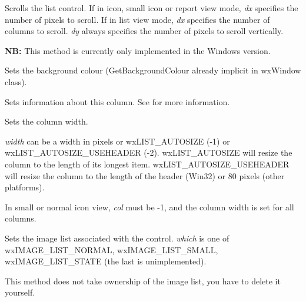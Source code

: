 \label{wxlistctrlscrolllist}


Scrolls the list control. If in icon, small icon or report view mode,
{\it dx} specifies the number of pixels to scroll. If in list view mode,
{\it dx} specifies the number of columns to scroll. {\it dy} always specifies
the number of pixels to scroll vertically.

{\bf NB:} This method is currently only implemented in the Windows version.


\label{wxlistctrlsetbackgroundcolour}


Sets the background colour (GetBackgroundColour already implicit in
wxWindow class).


\label{wxlistctrlsetcolumn}


Sets information about this column. See  for more
information.


\label{wxlistctrlsetcolumnwidth}


Sets the column width.

{\it width} can be a width in pixels or wxLIST\_AUTOSIZE (-1) or wxLIST\_AUTOSIZE\_USEHEADER (-2).
wxLIST\_AUTOSIZE will resize the column to the length of its longest item. wxLIST\_AUTOSIZE\_USEHEADER
will resize the column to the length of the header (Win32) or 80 pixels (other platforms).

In small or normal icon view, {\it col} must be -1, and the column width is set for all columns.


\label{wxlistctrlsetimagelist}


Sets the image list associated with the control. {\it which} is one of
wxIMAGE\_LIST\_NORMAL, wxIMAGE\_LIST\_SMALL, wxIMAGE\_LIST\_STATE (the last is unimplemented).

This method does not take ownership of the image list, you have to
delete it yourself.

